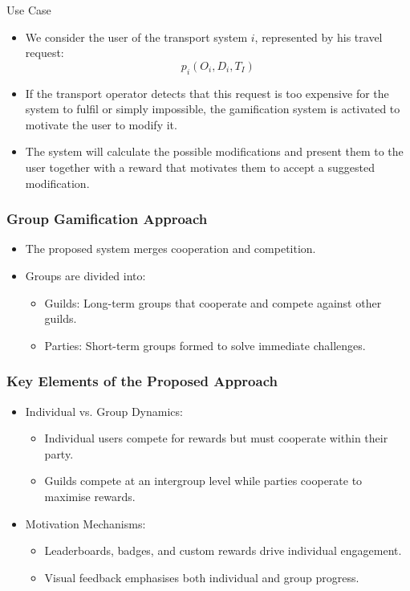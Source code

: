 \begin{frame}{Use Case}

    \begin{itemize}
        \item We consider the user of the \alert{transport system} $i$, represented by his travel request: $$p_i(O_i, D_i, T_I)$$

        \item If the transport operator detects that this request is too expensive for the system to fulfil or simply impossible, the gamification system is activated to motivate \alert{the user to modify it}. 
        
        \item The system will calculate the possible modifications and present them to the user together with a \alert{reward that motivates} them to accept a suggested modification. 
    \end{itemize}

\end{frame}

\begin{frame}
    \frametitle{Group Gamification Approach}
    \begin{itemize}
        \item The proposed system \alert{merges cooperation and competition}.
        \item Groups are divided into:
        \begin{itemize}
            \item Guilds: Long-term groups that cooperate and compete against other guilds.
            \item Parties: Short-term groups formed to solve immediate challenges.
        \end{itemize}
    \end{itemize}
\end{frame}

\begin{frame}
    \frametitle{Key Elements of the Proposed Approach}
    \begin{itemize}
        \item Individual vs. Group Dynamics:
        \begin{itemize}
            \item Individual users compete for rewards but must cooperate within their party.
            \item Guilds compete at an intergroup level while parties cooperate to maximise rewards.
        \end{itemize}
        \item Motivation Mechanisms:
        \begin{itemize}
            \item Leaderboards, badges, and custom rewards drive individual engagement.
            \item Visual feedback emphasises both individual and group progress.
        \end{itemize}
    \end{itemize}
\end{frame}

